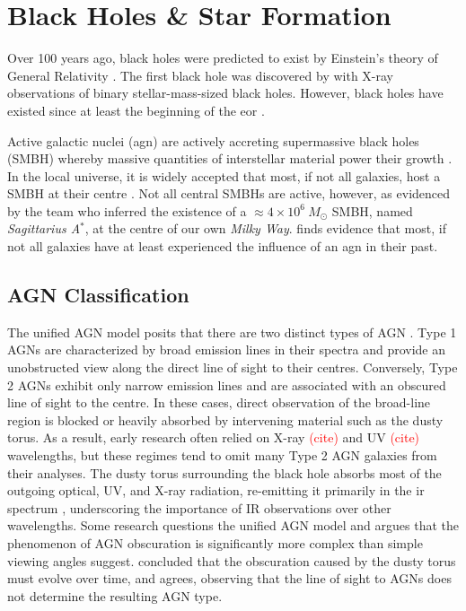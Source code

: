 \section{Black Holes \& Star Formation} \label{Sec: Active Galactic Nuclei}
Over 100 years ago, black holes were predicted to exist by Einstein's theory of General Relativity \citep{einstein_feldgleichungen_1915}. The first black hole was discovered by \cite{webster_cygnus_1972} with X-ray observations of binary stellar-mass-sized black holes. However, black holes have existed since at least the beginning of the \gls{eor} \citep{barkana_beginning_2001}.

Active galactic nuclei (\gls{agn}) are actively accreting supermassive black holes (SMBH) whereby massive quantities of interstellar material power their growth \citep{hopkins_cosmological_2008, han_evolution_2012, toba_9_2013, brown_infrared_2019}. In the local universe, it is widely accepted that most, if not all galaxies, host a SMBH at their centre \citep{gruppioni_modelling_2011, han_evolution_2012, brown_infrared_2019}. Not all central SMBHs are active, however, as evidenced by the \cite{event_horizon_telescope_collaboration_first_2022} team who inferred the existence of a $\approx 4 \times 10^{6}\ M_{\odot}$ SMBH, named \textit{Sagittarius A$^*$}, at the centre of our own \textit{Milky Way}. \cite{gruppioni_modelling_2011} finds evidence that most, if not all galaxies have at least experienced the influence of an \gls{agn} in their past. 

\subsection{AGN Classification}
The unified AGN model posits that there are two distinct types of AGN \citep{toba_9_2013}. Type 1 AGNs are characterized by broad emission lines in their spectra and provide an unobstructed view along the direct line of sight to their centres. Conversely, Type 2 AGNs exhibit only narrow emission lines and are associated with an obscured line of sight to the centre. In these cases, direct observation of the broad-line region is blocked or heavily absorbed by intervening material such as the dusty torus. As a result, early research often relied on X-ray \textcolor{red}{(cite)} and UV \textcolor{red}{(cite)} wavelengths, but these regimes tend to omit many Type 2 AGN galaxies from their analyses. The dusty torus surrounding the black hole absorbs most of the outgoing optical, UV, and X-ray radiation, re-emitting it primarily in the \gls{ir} spectrum \citep{fu_decomposing_2010, wu_mid-infrared_2011, assef_mid-ir-_2011, han_evolution_2012, toba_9_2013, brown_infrared_2019, symeonidis_agn_2021}, underscoring the importance of IR observations over other wavelengths. Some research questions the unified AGN model and argues that the phenomenon of AGN obscuration is significantly more complex than simple viewing angles suggest. \cite{han_evolution_2012} concluded that the obscuration caused by the dusty torus must evolve over time, and \cite{brown_infrared_2019} agrees, observing that the line of sight to AGNs does not determine the resulting AGN type.

